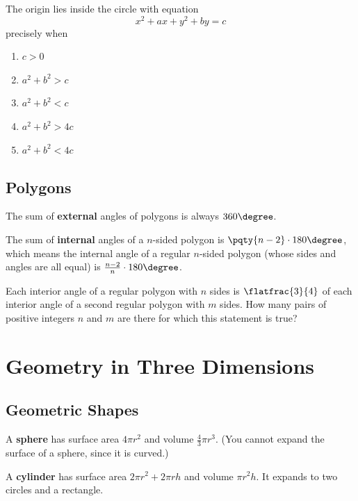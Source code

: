 \documentclass{article}
\begin{document}
\begin{example}
    The origin lies inside the circle with equation
    \[
        x^2 + ax + y^2 + by = c
    \]
    precisely when
    \begin{enumerate}[label=(\alph*)]
        \item \(c > 0\)
        \item \(a^2 + b^2 > c\)
        \item \(a^2 + b^2 < c\)
        \item \(a^2 + b^2 > 4c\)
        \item \(a^2 + b^2 < 4c\)
    \end{enumerate}
\end{example}

\subsection{Polygons}

The sum of \textbf{external} angles of polygons is always \(360 \degree\).

The sum of \textbf{internal} angles of a \(n\)-sided polygon is \(\pqty{n - 2} \cdot 180 \degree\), which means the internal angle of a regular \(n\)-sided polygon (whose sides and angles are all equal) is \(\frac{n - 2}{n} \cdot 180 \degree\).

\begin{example}[TMUA 2016 P2 Q20]
    Each interior angle of a regular polygon with \(n\) sides is \(\flatfrac{3}{4}\) of each interior angle of a second regular polygon with \(m\) sides. How many pairs of positive integers \(n\) and \(m\) are there for which this statement is true?
\end{example}

\section{Geometry in Three Dimensions}
\subsection{Geometric Shapes}

A \textbf{sphere} has surface area \(4 \pi r^2\) and volume \(\frac{4}{3} \pi r^3\). (You cannot expand the surface of a sphere, since it is curved.)

A \textbf{cylinder} has surface area \(2 \pi r^2 + 2 \pi r h\) and volume \(\pi r^2 h\). It expands to two circles and a rectangle.
\end{document}
